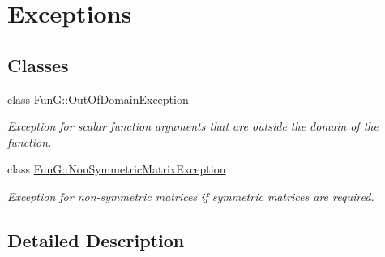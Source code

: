 \hypertarget{group__Exceptions}{\section{Exceptions}
\label{group__Exceptions}
}
\subsection*{Classes}
\begin{DoxyCompactItemize}
\item 
class \hyperlink{classFunG_1_1OutOfDomainException}{Fun\-G\-::\-Out\-Of\-Domain\-Exception}
\begin{DoxyCompactList}\small\item\em Exception for scalar function arguments that are outside the domain of the function. \end{DoxyCompactList}\item 
class \hyperlink{classFunG_1_1NonSymmetricMatrixException}{Fun\-G\-::\-Non\-Symmetric\-Matrix\-Exception}
\begin{DoxyCompactList}\small\item\em Exception for non-\/symmetric matrices if symmetric matrices are required. \end{DoxyCompactList}\end{DoxyCompactItemize}


\subsection{Detailed Description}
